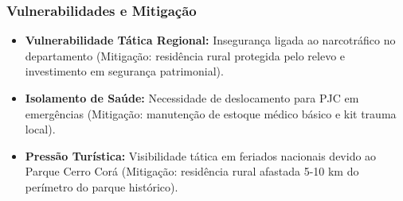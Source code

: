 \subsubsection{Vulnerabilidades e
Mitigação}

\begin{itemize}
\tightlist
\item
  \textbf{Vulnerabilidade Tática Regional:} Insegurança ligada ao
  narcotráfico no departamento (Mitigação: residência rural protegida
  pelo relevo e investimento em segurança patrimonial).
\item
  \textbf{Isolamento de Saúde:} Necessidade de deslocamento para PJC em
  emergências (Mitigação: manutenção de estoque médico básico e kit
  trauma local).
\item
  \textbf{Pressão Turística:} Visibilidade tática em feriados nacionais
  devido ao Parque Cerro Corá (Mitigação: residência rural afastada 5-10
  km do perímetro do parque histórico).
\end{itemize}

